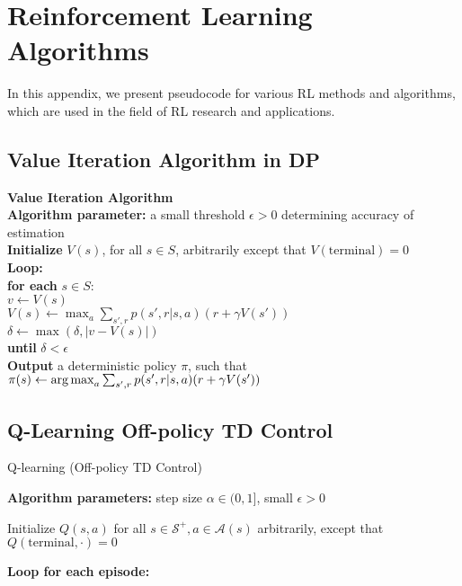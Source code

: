 \documentclass[../xlapes02]{subfiles}
\begin{document}
    \chapter{Reinforcement Learning Algorithms}
    In this appendix, we present pseudocode for various RL methods and algorithms, which are used in the field of RL research and applications.


    \section{Value Iteration Algorithm in DP}
    \begin{algorithm}[H]
        \label{alg:value-iteration}
        \SetAlgoLined
        \textbf{Value Iteration Algorithm}\\
        \textbf{Algorithm parameter:} a small threshold $\epsilon > 0$ determining accuracy of estimation\\
        \textbf{Initialize} $V(s)$, for all $s \in S$, arbitrarily except that $V(\text{terminal}) = 0$\\
        \textbf{Loop:}\\
        \quad \textbf{for each} $s \in S:$\\
        \quad \quad $v \leftarrow V(s)$\\
        \quad \quad $V(s) \leftarrow \max_a \sum_{s', r} p(s', r|s, a)(r + \gamma V(s'))$\\
        \quad \quad $\delta \leftarrow \max(\delta, |v - V(s)|)$\\
        \textbf{until} $\delta < \epsilon$\\
        \textbf{Output} a deterministic policy $\pi$, such that\\
        $\pi(s) \leftarrow \operatorname*{arg\,max}_a \sum_{s', r} p(s', r|s, a)(r + \gamma V(s'))$\\
    \end{algorithm}


    \section{Q-Learning Off-policy TD Control}
    \begin{algorithm}[h!]
        \caption{Q-learning (Off-policy TD Control)}
        \label{alg:q_learning}

        \textbf{Algorithm parameters:} step size $\alpha \in (0, 1]$, small $\epsilon > 0$

        Initialize $Q(s, a)$ for all $s \in \mathcal{S}^+, a \in \mathcal{A}(s)$ arbitrarily, except that $Q(\text{terminal}, \cdot) = 0$

        \textbf{Loop for each episode:}
    \end{algorithm}
\end{document}
